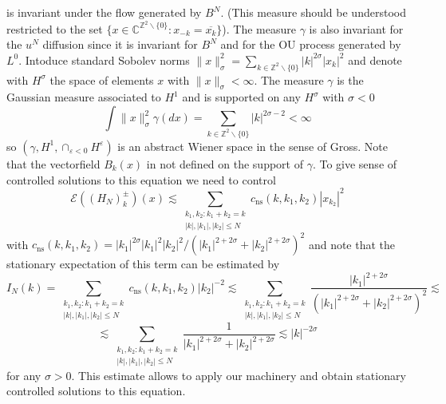 \documentclass[11pt,a4paper,draft,reqno]{amsart}
\newcommand{\ZZ}{\mathbb{Z}}
\newcommand{\CC}{\mathbb{C}}
\newcommand{\cE}{\mathcal{E}}
\newcommand{\eps}{\varepsilon}
\newcommand{\Q}{\ZZ^2\backslash\{0\}}
\begin{document}
is invariant under  the flow generated by $B^N$. (This measure should be understood restricted to the set $\{x \in \CC^{\Q} : x_{-k} = \overline{x_k} \}$).
The measure $\gamma$ is also invariant for the $u^N$ diffusion since it is invariant for $B^N$ and for the OU process generated by $L^0$.
Intoduce standard Sobolev norms
$
\|x\|_\sigma^2 = \sum_{k \in \Q} |k|^{2\sigma} |x_k|^2
$
and denote with $H^\sigma$ the space of elements $x$ with $\|x \|_{\sigma}<\infty$.
The measure $\gamma$ is the Gaussian measure associated to $H^1$ and is supported on any $H^\sigma$ with $\sigma<0$
$$
\int \|x\|_\sigma^2 \gamma(dx) = \sum_{k \in \Q}  |k|^{2\sigma-2} < \infty
$$
so $(\gamma, H^1, \cap_{\eps < 0}H^\eps)$ is an abstract Wiener space in the sense of Gross. Note that the vectorfield  $B_k(x)$ in not defined on the support of $\gamma$. To give sense of controlled solutions to this equation we need to control
$$
 \cE((H_{N})^\pm_k)(x)\lesssim     \sum_{\substack{k_1,k_2 :k_1+k_2=k\\|k|,|k_1|,|k_2|\le N}}c_{\text{ns}}(k,k_1,k_2) |x_{k_2}|^2  
$$
with $c_{\text{ns}}(k,k_1,k_2) = |k_1|^{2\sigma} |k_1|^2|k_2|^2/(|k_1|^{2+2\sigma}+|k_2|^{2+2\sigma})^2$ and note that the stationary expectation of this term can be estimated by
$$
I_N(k) =  \sum_{\substack{k_1,k_2 :k_1+k_2=k\\|k|,|k_1|,|k_2|\le N}}c_{\text{ns}}(k,k_1,k_2) |k_2|^{-2} \lesssim \sum_{\substack{k_1,k_2 :k_1+k_2=k\\|k|,|k_1|,|k_2|\le N}}\frac{|k_1|^{2+2\sigma}}{ (|k_1|^{2+2\sigma}+|k_2|^{2+2\sigma})^2}\lesssim 
$$
$$
 \lesssim \sum_{\substack{k_1,k_2 :k_1+k_2=k\\|k|,|k_1|,|k_2|\le N}}\frac{1}{ |k_1|^{2+2\sigma}+|k_2|^{2+2\sigma}}\lesssim |k|^{-2\sigma}
$$
for any $\sigma > 0$. This estimate allows to apply our machinery and obtain stationary controlled solutions to this equation. 




\end{document}
